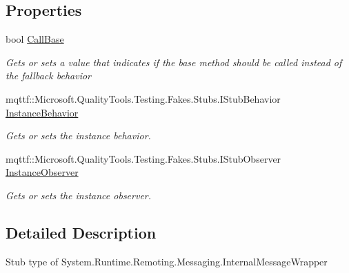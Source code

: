 \subsection*{Properties}
\begin{DoxyCompactItemize}
\item 
bool \hyperlink{class_system_1_1_runtime_1_1_remoting_1_1_messaging_1_1_fakes_1_1_stub_internal_message_wrapper_af074315aeb4681b4028e9dc5330ee9b5}{Call\-Base}
\begin{DoxyCompactList}\small\item\em Gets or sets a value that indicates if the base method should be called instead of the fallback behavior\end{DoxyCompactList}\item 
mqttf\-::\-Microsoft.\-Quality\-Tools.\-Testing.\-Fakes.\-Stubs.\-I\-Stub\-Behavior \hyperlink{class_system_1_1_runtime_1_1_remoting_1_1_messaging_1_1_fakes_1_1_stub_internal_message_wrapper_ab7c75c36692378ef7496200b99d60799}{Instance\-Behavior}
\begin{DoxyCompactList}\small\item\em Gets or sets the instance behavior.\end{DoxyCompactList}\item 
mqttf\-::\-Microsoft.\-Quality\-Tools.\-Testing.\-Fakes.\-Stubs.\-I\-Stub\-Observer \hyperlink{class_system_1_1_runtime_1_1_remoting_1_1_messaging_1_1_fakes_1_1_stub_internal_message_wrapper_a2ac642b7c0748f2d3c882022523fb1b6}{Instance\-Observer}
\begin{DoxyCompactList}\small\item\em Gets or sets the instance observer.\end{DoxyCompactList}\end{DoxyCompactItemize}


\subsection{Detailed Description}
Stub type of System.\-Runtime.\-Remoting.\-Messaging.\-Internal\-Message\-Wrapper



